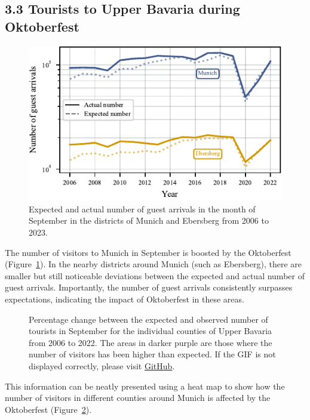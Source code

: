 \documentclass{article}
\theoremstyle{plain}
\theoremstyle{definition}
\theoremstyle{remark}
\begin{document}
\subsection*{3.3 Tourists to Upper Bavaria during Oktoberfest}
\begin{figure}[ht] %
\includegraphics{fig/actual_vs_expected_arrivals.pdf} %
\caption{Expected and actual number of guest arrivals in the month of September in the districts of Munich and Ebersberg from 2006 to 2023.}
\label{fig:exp_vs_actual_arrivals}
\end{figure}
The number of visitors to Munich in September is boosted by the Oktoberfest (Figure~\ref{fig:exp_vs_actual_arrivals}). In the nearby districts around Munich (such as Ebersberg), there are smaller but still noticeable deviations between the expected and actual number of guest arrivals. Importantly, the number of guest arrivals consistently surpasses expectations, indicating the impact of Oktoberfest in these areas.
\begin{figure}[ht]
  \centering
  \caption{Percentage change between the expected and observed number of tourists in September for the individual counties of Upper Bavaria from 2006 to 2022. The areas in darker purple are those where the number of visitors has been higher than expected. If the GIF is not displayed correctly, please visit \href{https://github.com/JuliaGraf/Data-Literacy-Report/blob/b13d5f18d5c95ca0100450f6b692807ec280bffd/doc/fig/GifMap.gif}{GitHub}.}
  \label{fig:heatmap}
\end{figure}
This information can be neatly presented using a heat map to show how the number of visitors in different counties around Munich is affected by the Oktoberfest (Figure~\ref{fig:heatmap}).\textbf{}
\end{document}
